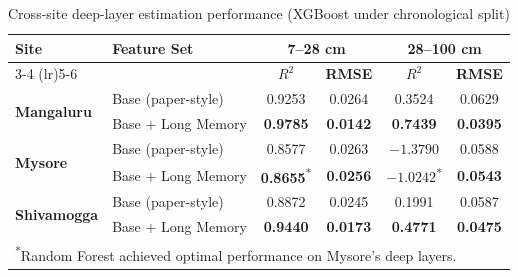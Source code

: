 \documentclass[12pt, a4paper]{article}
\begin{document}
\begin{table}[H]
\centering
\caption{Cross-site deep-layer estimation performance (XGBoost under chronological split)}
\label{tab:cross_deep}
\begin{tabular}{llcccc}
\toprule
\textbf{Site} & \textbf{Feature Set} & \multicolumn{2}{c}{\textbf{7--28 cm}} & \multicolumn{2}{c}{\textbf{28--100 cm}} \\
\cmidrule(lr){3-4} \cmidrule(lr){5-6}
& & \textbf{$R^2$} & \textbf{RMSE} & \textbf{$R^2$} & \textbf{RMSE} \\
\midrule
\multirow{2}{*}{\textbf{Mangaluru}}  & Base (paper-style) & 0.9253 & 0.0264 & 0.3524 & 0.0629 \\
                                      & Base + Long Memory & \textbf{0.9785} & \textbf{0.0142} & \textbf{0.7439} & \textbf{0.0395} \\
\midrule
\multirow{2}{*}{\textbf{Mysore}}     & Base (paper-style) & 0.8577 & 0.0263 & $-1.3790$ & 0.0588 \\
                                      & Base + Long Memory & \textbf{0.8655}\textsuperscript{*} & \textbf{0.0256} & $-1.0242$\textsuperscript{*} & \textbf{0.0543} \\
\midrule
\multirow{2}{*}{\textbf{Shivamogga}} & Base (paper-style) & 0.8872 & 0.0245 & 0.1991 & 0.0587 \\
                                      & Base + Long Memory & \textbf{0.9440} & \textbf{0.0173} & \textbf{0.4771} & \textbf{0.0475} \\
\bottomrule
\multicolumn{6}{l}{\footnotesize \textsuperscript{*}Random Forest achieved optimal performance on Mysore's deep layers.}
\end{tabular}
\end{table}
\end{document}
